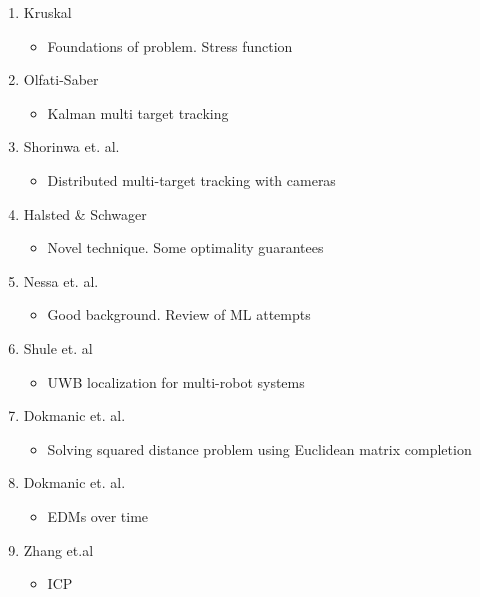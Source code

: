 \documentclass{IEEEtran}
\begin{document}
\begin{enumerate}
    \item Kruskal \cite{Kruskal1964}
    \begin{itemize}
        \item Foundations of problem. Stress function 
    \end{itemize}
    \item Olfati-Saber \cite{kalman_distributed}
    \begin{itemize}
        \item Kalman multi target tracking 
    \end{itemize}
    \item Shorinwa et. al. \cite{distributed_multitarget_tracking}
    \begin{itemize}
        \item Distributed multi-target tracking with cameras 
    \end{itemize}
    
    \item Halsted \& Schwager \cite{R_elevator}
    \begin{itemize}
        \item Novel technique. Some optimality guarantees 
    \end{itemize}

    \item Nessa et. al. \cite{ML_positioning_survey}
    \begin{itemize}
        \item Good background. Review of ML attempts 
    \end{itemize}

    \item Shule et. al 
    \begin{itemize}
        \item UWB localization for multi-robot systems 
    \end{itemize}

    \item Dokmanic et. al. 
    \begin{itemize}
        \item Solving squared distance problem using Euclidean matrix completion
    \end{itemize} 

    \item Dokmanic et. al.
    \begin{itemize}
        \item EDMs over time
    \end{itemize}

    \item Zhang et.al 
    \begin{itemize}
        \item ICP 
    \end{itemize}
\end{enumerate}
\end{document}
